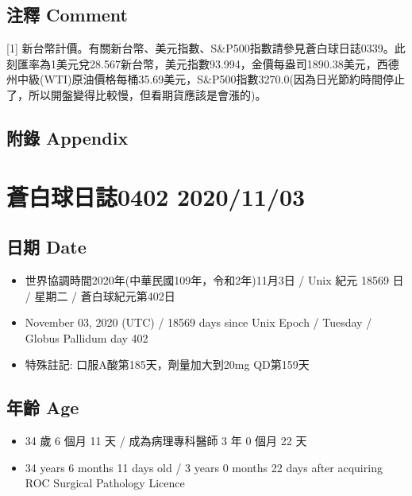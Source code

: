 \documentclass[
]{article}
\providecommand{\tightlist}{%
  \setlength{\itemsep}{0pt}\setlength{\parskip}{0pt}}
\begin{document}
\hypertarget{ux6ce8ux91cb-comment-59}{%
\subsection{注釋 Comment}\label{ux6ce8ux91cb-comment-59}}

{[}1{]}
新台幣計價。有關新台幣、美元指數、S\&P500指數請參見蒼白球日誌0339。此刻匯率為1美元兌28.567新台幣，美元指數93.994，金價每盎司1890.38美元，西德州中級(WTI)原油價格每桶35.69美元，S\&P500指數3270.0(因為日光節約時間停止了，所以開盤變得比較慢，但看期貨應該是會漲的)。

\hypertarget{ux9644ux9304-appendix-59}{%
\subsection{附錄 Appendix}\label{ux9644ux9304-appendix-59}}

\hypertarget{ux84bcux767dux7403ux65e5ux8a8c0402-20201103}{%
\section{蒼白球日誌0402
2020/11/03}\label{ux84bcux767dux7403ux65e5ux8a8c0402-20201103}}

\hypertarget{ux65e5ux671f-date-60}{%
\subsection{日期 Date}\label{ux65e5ux671f-date-60}}

\begin{itemize}
\tightlist
\item
  世界協調時間2020年(中華民國109年，令和2年)11月3日 / Unix 紀元 18569 日
  / 星期二 / 蒼白球紀元第402日
\item
  November 03, 2020 (UTC) / 18569 days since Unix Epoch / Tuesday /
  Globus Pallidum day 402
\item
  特殊註記: 口服A酸第185天，劑量加大到20mg QD第159天
\end{itemize}

\hypertarget{ux5e74ux9f61-age-60}{%
\subsection{年齡 Age}\label{ux5e74ux9f61-age-60}}

\begin{itemize}
\tightlist
\item
  34 歲 6 個月 11 天 / 成為病理專科醫師 3 年 0 個月 22 天
\item
  34 years 6 months 11 days old / 3 years 0 months 22 days after
  acquiring ROC Surgical Pathology Licence
\end{itemize}
\end{document}
